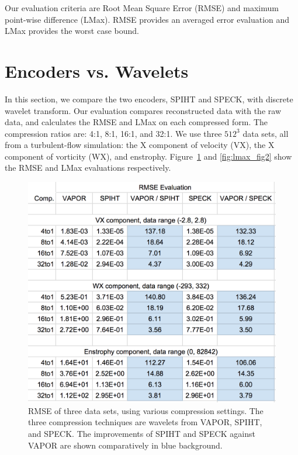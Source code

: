 \documentclass[review]{vgtc}                 %
\begin{document}
Our evaluation criteria are Root Mean Square Error (RMSE) and
maximum point-wise difference (LMax). 
%
RMSE provides an averaged error evaluation and LMax provides the
worst case bound.


\section{Encoders vs. Wavelets}
\label{sec:encoders_wavelets}
%
In this section, we compare the two encoders, SPIHT and SPECK, 
with discrete wavelet transform.
%
Our evaluation compares reconstructed data with the raw data, and 
calculates the RMSE and LMax on each compressed form.
%
The compression ratios are: 4:1, 8:1, 16:1, and 32:1.
%
We use three $512^3$ data sets, all from a turbulent-flow simulation:
the X component of velocity (VX), the X component of vorticity (WX), and enstrophy.
%
Figure~\ref{fig:rmse_fig1} and \ref{fig:lmax_fig2} show the RMSE and LMax evaluations respectively.

\begin{figure}
  \centering
    \includegraphics[width=1\columnwidth]{figs/rmse_fig1.png}
  \caption{
RMSE of three data sets, using various compression settings.
%
The three compression techniques are wavelets from VAPOR, 
SPIHT, and SPECK.
%
The improvements of SPIHT and SPECK against VAPOR 
are shown comparatively in blue background.
}
  \label{fig:rmse_fig1}
\end{figure}
\end{document}

